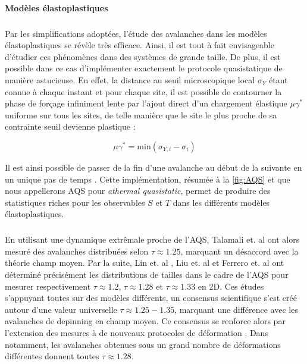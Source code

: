 \paragraph{Modèles élastoplastiques}

\subparagraph{}Par les simplifications adoptées, l'étude des avalanches dans les modèles élastoplastiques se révèle très efficace. Ainsi, il est tout à fait envisageable d'étudier ces phénomènes dans des systèmes de grande taille. De plus, il est possible dans ce cas d'implémenter exactement le protocole quasistatique de manière astucieuse. En effet, la distance au seuil microscopique local $\sigma_Y$ étant connue à chaque instant et pour chaque site, il est possible de contourner la phase de forçage infiniment lente par l'ajout direct d'un chargement élastique $\mu\gamma^*$ uniforme sur tous les sites, de telle manière que le site le plus proche de sa contrainte seuil devienne plastique :

\begin{equation}
	\mu\gamma^* = \mathrm{min}(\sigma_{Y,i}-\sigma_i)
\end{equation}

\noindent Il est ainsi possible de passer de la fin d'une avalanche au début de la suivante en un unique pas de temps \cite{lin_scaling_2014}. Cette implémentation, résumée à la \autoref{fig:AQS} et que nous appellerons AQS pour \textit{athermal quasistatic}, permet de produire des statistiques riches pour les observables $S$ et $T$ dans les différents modèles élastoplastiques.

\subparagraph{}En utilisant une dynamique extrêmale proche de l'AQS, Talamali et. al \cite{talamali_avalanches_2011} ont alors mesuré des avalanches distribuées selon $\tau \approx 1.25$, marquant un désaccord avec la théorie champ moyen. Par la suite, Lin et. al \cite{lin_scaling_2014}, Liu et. al \cite{liu_driving_2016} et Ferrero et. al \cite{ferrero_criticality_2019} ont déterminé précisément les distributions de tailles dans le cadre de l'AQS pour mesurer respectivement $\tau \approx 1.2$, $\tau \approx 1.28$ et $\tau\approx 1.33$ en 2D. Ces études s'appuyant toutes sur des modèles différents, un consensus scientifique s'est créé autour d'une valeur universelle $\tau \approx 1.25-1.35$, marquant une différence avec les avalanches de depinning en champ moyen. Ce consensus se renforce alors par l'extension des mesures à de nouveaux protocoles de déformation \cite{lin_scaling_2014, budrikis_universal_2017}. Dans \cite{budrikis_universal_2017} notamment, les avalanches obtenues sous un grand nombre de déformations différentes donnent toutes $\tau\approx1.28$. 

